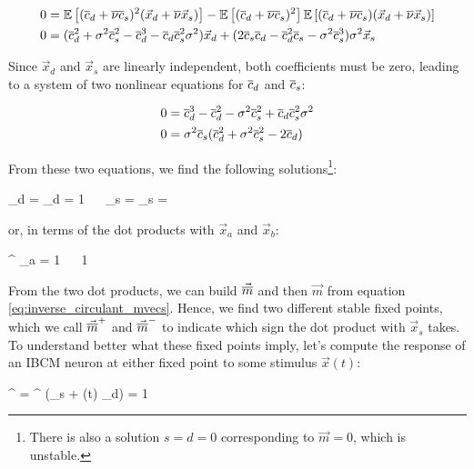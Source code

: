 \begin{align}
	0 &= \mathbb{E}\left[ (\overline{c}_d + \overline{\nu} \overline{c}_s)^2 (\vec{x}_d + \overline{\nu} \vec{x}_s) \right] - \mathbb{E}\left[ (\overline{c}_d + \overline{\nu} \overline{c}_s)^2 \right]\mathbb{E}\left[ (\overline{c}_d + \overline{\nu} \overline{c}_s) (\vec{x}_d + \overline{\nu} \vec{x}_s) \right]  \nonumber \\
	0 &= (\overline{c}_d^2 + \sigma^2 \overline{c}_s^2 - \overline{c}_d^3 - \overline{c}_d \overline{c}_s^2 \sigma^2) \vec{x}_d + (2 \overline{c}_s \overline{c}_d - \overline{c}_d^2 \overline{c}_s -\sigma^2 \overline{c}_s^3)\sigma^2 \vec{x}_s  \label{eq:fixed_points_2d_developed}
\end{align}

Since $\vec{x}_d$ and $\vec{x}_s$ are linearly independent, both coefficients must be zero, leading to a system of two nonlinear equations for $\overline{c}_d$ and $\overline{c}_s$:

\begin{align}
	0 &= \overline{c}_d^3 - \overline{c}_d^2 - \sigma^2 \overline{c}_s^2 + \overline{c}_d \overline{c}_s^2 \sigma^2 \\
	0 &= \sigma^2 \overline{c}_s ( \overline{c}_d^2 + \sigma^2 \overline{c}_s^2 - 2\overline{c}_d)
\end{align}

From these two equations, we find the following solutions{\protect \footnote{
There is also a solution $s=d=0$ corresponding to $\vec{m} = 0$, which is unstable.
}}:

\beq
	_d =   \cdot {}_d = 1 \,\,  \,\, _s =  \cdot {}_s = \pm {}
	\label{eq:ibcm_2d_solution_sd}
\eeq

or, in terms of the dot products with $\vec{x}_a$ and $\vec{x}_b$:

\beq
	^{\pm} \cdot {}_a = 1 \pm {}  \,\,  \,\, 1 \mp {}
	\label{eq:ibcm_2d_solution_ab}
\eeq

From the two dot products, we can build $\vec{\overline{m}}$ and then $\vec{m}$ from equation \eqref{eq:inverse_circulant_mvecs}. 
Hence, we find two different stable fixed points, which we call $\vec{\overline{m}}^+$ and $\vec{\overline{m}}^-$ to indicate which sign the dot product with $\vec{x}_s$ takes. To understand better what these fixed points imply, let's compute the response of an IBCM neuron at either fixed point to some stimulus $\vec{x}(t)$:

\beq
	^{\pm} = ^{\pm} \cdot (_s + \ovl{\nu}(t) _d) = 1 \pm \frac{\ovl{\nu}}{\sigma}
	\label{eq:ibcm_2d_response}
\eeq

